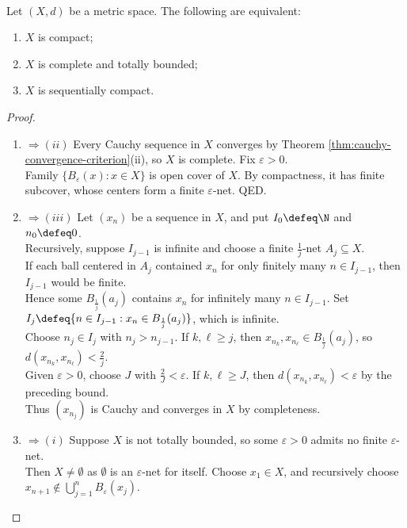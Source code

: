 \begin{theorem} \label{thm:compact-complete-totally-bounded} \\
Let $(X,d)$ be a metric space. The following are equivalent:
\begin{enumerate}[label=(\roman*)]
\setlength{\itemsep}{0pt}
\item $X$ is compact;
\item $X$ is complete and totally bounded;
\item $X$ is sequentially compact.
\end{enumerate}
\begin{proof}
\begin{enumerate}[label=(\roman*)]
\setlength{\itemsep}{0pt}
\item[$(i)$]$\Rightarrow (ii)$ Every Cauchy sequence in $X$ converges by Theorem \ref{thm:cauchy-convergence-criterion}(ii), so $X$ is complete. Fix $\varepsilon>0$.\\
Family $\{B_\varepsilon(x):x\in X\}$ is open cover of $X$. By compactness, it has finite subcover, whose centers form a finite $\varepsilon$-net. QED.
\item[$(ii)$]$\Rightarrow (iii)$ Let $(x_n)$ be a sequence in $X$, and put $I_0\defeq\N$ and $n_0\defeq0$.\\
Recursively, suppose $I_{j-1}$ is infinite and choose a finite $\frac{1}{j}$-net $A_j\subseteq X$.\\
If each ball centered in $A_j$ contained $x_n$ for only finitely many $n\in I_{j-1}$, then $I_{j-1}$ would be finite.\\
Hence some $B_{\frac{1}{j}}(a_j)$ contains $x_n$ for infinitely many $n\in I_{j-1}$. Set $I_j\defeq\{n\in I_{j-1}:x_n\in B_{\frac{1}{j}}(a_j)\}$, which is infinite.\\
Choose $n_j\in I_j$ with $n_j>n_{j-1}$. If $k,\ell\geq j$, then $x_{n_k},x_{n_\ell}\in B_{\frac{1}{j}}(a_j)$, so $d(x_{n_k},x_{n_\ell})<\frac{2}{j}$.\\
Given $\varepsilon>0$, choose $J$ with $\frac{2}{J}<\varepsilon$. If $k,\ell\geq J$, then $d(x_{n_k},x_{n_\ell})<\varepsilon$ by the preceding bound.\\
Thus $(x_{n_j})$ is Cauchy and converges in $X$ by completeness.
\item[$(iii)$]$\Rightarrow (i)$ Suppose $X$ is not totally bounded, so some $\varepsilon>0$ admits no finite $\varepsilon$-net.\\
Then $X\ne\emptyset$ as $\emptyset$ is an $\varepsilon$-net for itself. Choose $x_1\in X$, and recursively choose $x_{n+1}\notin\bigcup\limits_{j=1}^{n}B_\varepsilon(x_j)$.\\

\end{enumerate}
\end{proof}
\end{theorem}

